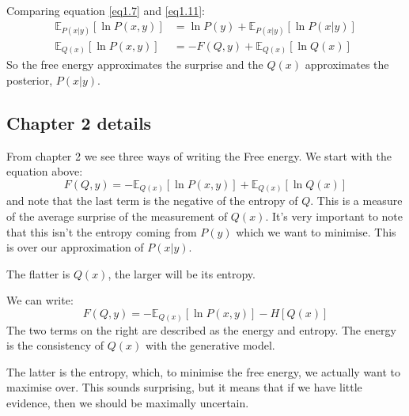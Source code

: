 \documentclass[11pt,oneside]{memoir}
\begin{document}
Comparing equation \ref{eq1.7} and \ref{eq1.11}:
\begin{align}
    \mathbb{E}_{P(x|y)}\left[\ln P(x,y)\right]&=\ln P(y)+\mathbb{E}_{P(x|y)}\left[\ln P(x|y)\right]\\
    \mathbb{E}_{Q(x)}\left[\ln P(x,y)\right]&=-F(Q,y)+\mathbb{E}_{Q(x)}\left[\ln Q(x)\right]
\end{align}
So the free energy approximates the surprise and the $Q(x)$ approximates the posterior, $P(x|y)$.

\subsection{Chapter 2 details}

From chapter 2 we see three ways of writing the Free energy. We start with the equation above:
\begin{equation}
    F(Q,y)=-\mathbb{E}_{Q(x)}\left[\ln P(x,y)\right]+\mathbb{E}_{Q(x)}\left[\ln Q(x)\right]
\end{equation}
and note that the last term is the negative of the entropy of $Q$. This is a measure of the average surprise of the measurement of $Q(x)$. It's very important to note that this isn't the entropy coming from $P(y)$ which we want to minimise. This is over our approximation of $P(x|y)$. 

The flatter is $Q(x)$, the larger will be its entropy.

We can write:
\begin{equation}
    F(Q,y)=-\mathbb{E}_{Q(x)}\left[\ln P(x,y)\right]-H\left[ Q(x)\right]
\end{equation}
The two terms on the right are described as the energy and entropy. The energy is the consistency of $Q(x)$ with the generative model.

The latter is the entropy, which, to minimise the free energy, we actually want to maximise over. This sounds surprising, but it means that if we have little evidence, then we should be maximally uncertain.
\end{document}
